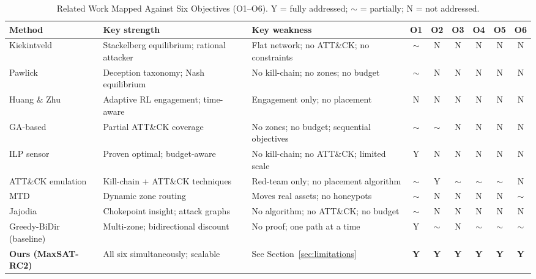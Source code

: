 \documentclass[journal]{IEEEtran}
\begin{document}
\begin{table}[t]
\caption{Related Work Mapped Against Six Objectives (O1--O6).
  Y = fully addressed; $\sim$ = partially; N = not addressed.}
\label{tab:related_obj}
\centering
\renewcommand{\arraystretch}{1.2}
\begin{tabular}{lp{3.0cm}p{3.4cm}cccccc}
\toprule
Method & Key strength & Key weakness & O1 & O2 & O3 & O4 & O5 & O6 \\
\midrule
Kiekintveld~\cite{kiekintveld2015} &
  Stackelberg equilibrium; rational attacker &
  Flat network; no ATT\&CK; no constraints &
  $\sim$ & N & N & N & N & N \\
Pawlick~\cite{pawlick2019} &
  Deception taxonomy; Nash equilibrium &
  No kill-chain; no zones; no budget &
  $\sim$ & N & N & N & N & N \\
Huang \& Zhu~\cite{huang2019} &
  Adaptive RL engagement; time-aware &
  Engagement only; no placement &
  N & N & N & N & N & N \\
GA-based~\cite{hemberg2018} &
  Partial ATT\&CK coverage &
  No zones; no budget; sequential objectives &
  $\sim$ & $\sim$ & N & N & N & N \\
ILP sensor~\cite{saha2015} &
  Proven optimal; budget-aware &
  No kill-chain; no ATT\&CK; limited scale &
  Y & N & N & N & N & N \\
ATT\&CK emulation~\cite{applebaum2016} &
  Kill-chain + ATT\&CK techniques &
  Red-team only; no placement algorithm &
  $\sim$ & Y & $\sim$ & $\sim$ & $\sim$ & N \\
MTD~\cite{zhu2013} &
  Dynamic zone routing &
  Moves real assets; no honeypots &
  $\sim$ & N & N & N & N & $\sim$ \\
Jajodia~\cite{jajodia2005} &
  Chokepoint insight; attack graphs &
  No algorithm; no ATT\&CK; no budget &
  $\sim$ & N & N & N & N & N \\
Greedy-BiDir (baseline) &
  Multi-zone; bidirectional discount &
  No proof; one path at a time &
  Y & $\sim$ & N & $\sim$ & $\sim$ & $\sim$ \\
\midrule
\textbf{Ours (MaxSAT-RC2)} &
  All six simultaneously; scalable &
  See Section~\ref{sec:limitations} &
  \textbf{Y} & \textbf{Y} & \textbf{Y} & \textbf{Y} & \textbf{Y} & \textbf{Y} \\
\bottomrule
\end{tabular}
\end{table}

\end{document}
